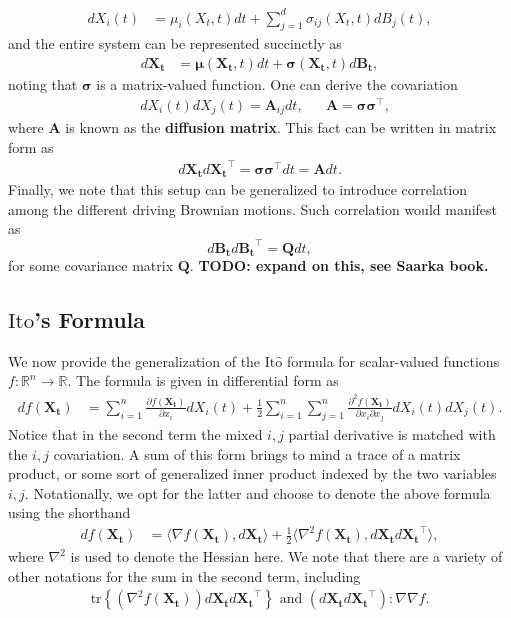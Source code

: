 \documentclass[12pt]{article}
\newcommand{\B}[1]{\boldsymbol{#1}}
\newcommand{\R}{\mathbb{R}}
\newcommand{\state}[1][t]{X_{#1}}
\newcommand{\BM}[1][t]{B_{#1}} %
\newcommand{\ito}{\text{It}\hat{\text{o}}}
\newcommand{\dimBM}{d} %
\newcommand{\dimState}{n}
\newcommand{\diffMat}{\mathbf{A}} %
\begin{document}
\begin{align*}
d\state[i](t) &= \mu_i(\state,t) dt + \sum_{j=1}^{\dimBM} \sigma_{ij}(\state,t) d\BM[j](t), 
\end{align*}
and the entire system can be represented succinctly as
\begin{align}
d\B\state &= \B\mu(\B\state,t) dt + \B\sigma(\B\state,t) d\B\BM, \label{SDE_multidim}
\end{align}
noting that $\B\sigma$ is a matrix-valued function. One can derive the covariation 
\begin{align*}
&d\state[i](t) d\state[j](t) = \diffMat_{ij} dt, &&\diffMat = \B\sigma \B\sigma^\top, 
\end{align*}
where $\diffMat$ is known as the \textbf{diffusion matrix}. This fact can be written in matrix form as 
\begin{align*}
d\B\state d\B\state^\top = \B\sigma\B\sigma^\top dt = \diffMat dt.
\end{align*}
Finally, we note that this setup can be generalized to introduce correlation among the different driving Brownian motions. Such correlation would manifest as 
\[
d\B\BM d\B\BM^\top = \B{Q} dt, 
\]
for some covariance matrix $\B{Q}$. \textbf{TODO: expand on this, see Saarka book.}

\subsection{$\ito$'s Formula}
We now provide the generalization of the $\ito$ formula for scalar-valued functions $f: \R^{\dimState} \to \R$. The formula is given in differential form as
\begin{align*}
df(\B\state) &= \sum_{i=1}^{\dimState} \frac{\partial f(\B\state)}{\partial x_i} d\state[i](t) + \frac{1}{2} \sum_{i=1}^{\dimState}\sum_{j=1}^{\dimState} \frac{\partial^2 f(\B\state)}{\partial x_i \partial x_j} d\state[i](t) d\state[j](t).
\end{align*}
Notice that in the second term the mixed $i,j$ partial derivative is matched with the $i,j$ covariation. A sum of this form brings to mind a trace of a matrix product, or some sort of generalized inner product indexed by the 
two variables $i,j$. Notationally, we opt for the latter and choose to denote the above formula using the shorthand 
\begin{align*}
df(\B\state) &= \langle \nabla f(\B\state), d\B\state \rangle + \frac{1}{2} \langle \nabla^2 f(\B\state), d\B\state d\B\state^\top  \rangle,
\end{align*}
where $\nabla^2$ is used to denote the Hessian here. We note that there are a variety of other notations for the sum in the second term, including 
\begin{align*}
\text{tr}\left\{(\nabla^2 f(\B\state)) d\B\state d\B\state^\top \right\} \text{ and } (d\B\state d\B\state^\top) : \nabla\nabla f.
\end{align*}
\end{document}
